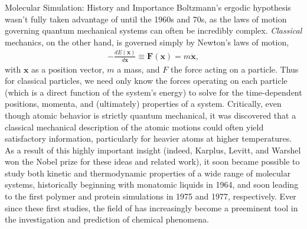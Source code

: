 \begin{section}{Molecular Simulation: History and Importance}
Boltzmann's ergodic hypothesis wasn't fully taken advantage of until the 1960s
and 70s, as the laws of motion governing quantum mechanical systems can often
be incredibly complex. \emph{Classical} mechanics, on the other hand, is
governed simply by Newton's laws of motion,
%
\begin{align}
\label{eq:intro-newton}
- \frac{d E(\bm x)}{d \bm x} \equiv \bm F(\bm x) = m \ddot{\bm x}, 
\end{align}
%
with $\bm x$ as a position vector, $m$ a mass, and $F$ the force acting on a
particle. Thus for classical particles, we need only know the forces operating
on each particle (which is a direct function of the system's energy) to solve for the
time-dependent positions, momenta, and (ultimately) properties of a system.
Critically, even though atomic behavior is strictly quantum mechanical, it was
discovered that a classical mechanical description of the atomic motions could
often yield satisfactory information, particularly for heavier atoms at higher
temperatures.
\cite{Karplus2014}
As a result of this highly important insight (indeed, Karplus, Levitt, and
Warshel won the Nobel prize for these ideas and related
work),\cite{Karplus2014} it soon became possible to study both kinetic and
thermodynamic properties of a wide range of molecular systems, historically beginning with monatomic
liquids in 1964, and soon leading to the first polymer and protein simulations in 1975 and
1977, respectively.\cite{VanGunsteren1990} Ever since these first studies, the field of \md has 
increasingly become a preeminent tool in the investigation and prediction of chemical
phenomena.


\end{section}
